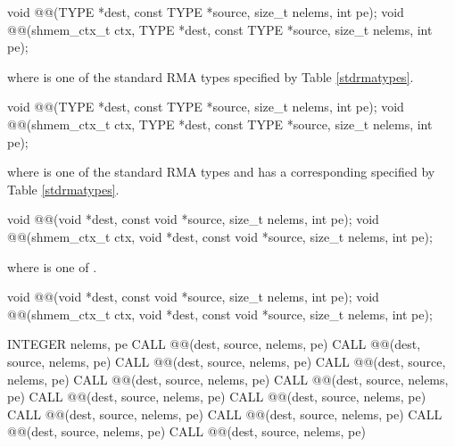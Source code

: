 
\begin{apidefinition}

\begin{C11synopsis}
void @@(TYPE *dest, const TYPE *source, size_t nelems, int pe);
void @@(shmem_ctx_t ctx, TYPE *dest, const TYPE *source, size_t nelems, int pe);
\end{C11synopsis}
where \TYPE{} is one of the standard \ac{RMA} types specified by Table \ref{stdrmatypes}.

\begin{Csynopsis}
void @@(TYPE *dest, const TYPE *source, size_t nelems, int pe);
void @@(shmem_ctx_t ctx, TYPE *dest, const TYPE *source, size_t nelems, int pe);
\end{Csynopsis}
where \TYPE{} is one of the standard \ac{RMA} types and has a corresponding \TYPENAME{} specified by Table \ref{stdrmatypes}.

\begin{CsynopsisCol}
void @@(void *dest, const void *source, size_t  nelems, int pe);
void @@(shmem_ctx_t ctx, void *dest, const void *source, size_t  nelems, int pe);
\end{CsynopsisCol}
where \SIZE{} is one of .

\begin{CsynopsisCol}
void @@(void *dest, const void *source, size_t nelems, int pe);
void @@(shmem_ctx_t ctx, void *dest, const void *source, size_t nelems, int pe);
\end{CsynopsisCol}

\begin{Fsynopsis}
INTEGER nelems, pe
CALL @@(dest, source, nelems, pe)
CALL @@(dest, source, nelems, pe)
CALL @@(dest, source, nelems, pe)
CALL @@(dest, source, nelems, pe)
CALL @@(dest, source, nelems, pe)
CALL @@(dest, source, nelems, pe)
CALL @@(dest, source, nelems, pe)
CALL @@(dest, source, nelems, pe)
CALL @@(dest, source, nelems, pe)
CALL @@(dest, source, nelems, pe)
CALL @@(dest, source, nelems, pe)
CALL @@(dest, source, nelems, pe)
\end{Fsynopsis}


\end{apidefinition}

